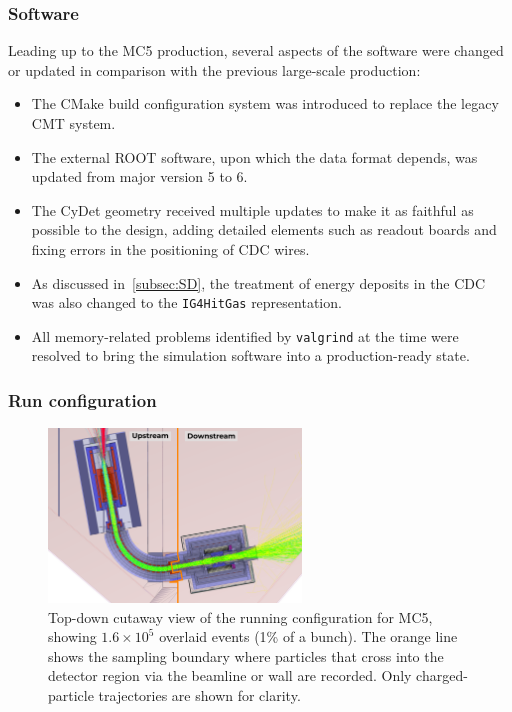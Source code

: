 \subsubsection{Software}
Leading up to the MC5 production, several aspects of the software were changed or updated in comparison with the previous large-scale production:
\begin{itemize}
    \item The CMake build configuration system was introduced to replace the legacy CMT system. 
    \item The external ROOT software, upon which the \oaEvent data format depends, was updated from major version 5 to 6.
    \item The CyDet geometry received multiple updates to make it as faithful as possible to the design, adding detailed elements such as readout boards and fixing errors in the positioning of CDC wires. 
    \item As discussed in~\ref{subsec:SD}, the treatment of energy deposits in the CDC was also changed to the \texttt{IG4HitGas} representation.
    \item All memory-related problems identified by \texttt{valgrind} at the time were resolved to bring the simulation software into a production-ready state.
\end{itemize}

\subsubsection{Run configuration}

\begin{figure}
    \centering
    \includegraphics[width=0.6\textwidth]{chapter3/sampling_plane_illu_ink.pdf}
    \caption{
        Top-down cutaway view of the running configuration for MC5,
        showing $1.6\times 10^5$ overlaid events (1\% of a bunch). The orange
        line shows the sampling boundary where particles that cross into the
        detector region via the beamline or wall are recorded. Only
        charged-particle trajectories are shown for clarity.
    }
    \label{fig:Phase-I Sampling World}
\end{figure}



